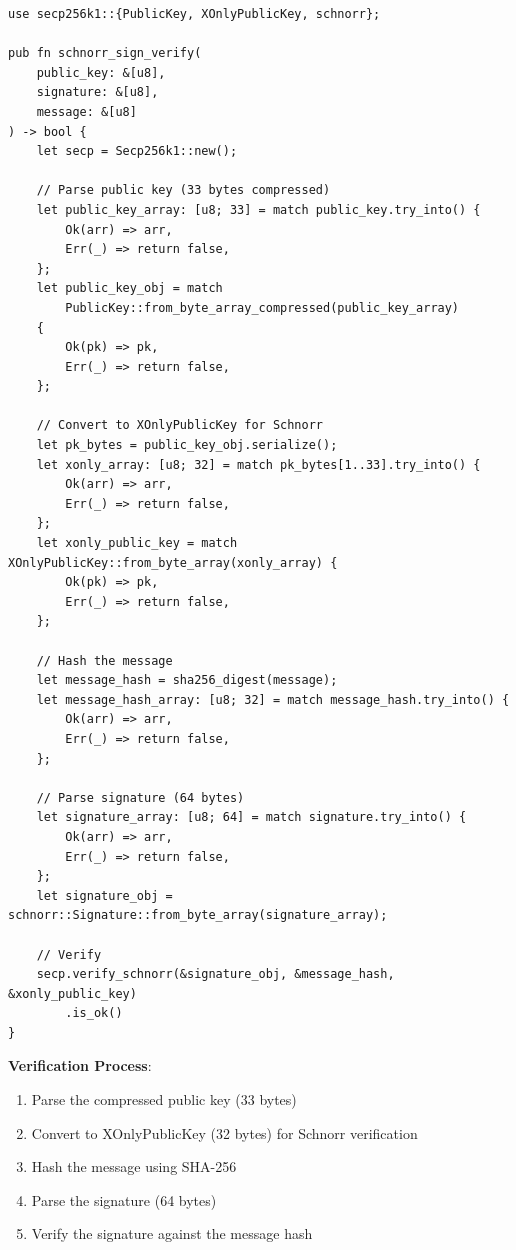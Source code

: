 \begin{listing}[htbp]
\caption{Schnorr signature verification ()}
\label{lst:ch08-schnorr-verify}
\begin{verbatim}
use secp256k1::{PublicKey, XOnlyPublicKey, schnorr};

pub fn schnorr_sign_verify(
    public_key: &[u8],
    signature: &[u8],
    message: &[u8]
) -> bool {
    let secp = Secp256k1::new();

    // Parse public key (33 bytes compressed)
    let public_key_array: [u8; 33] = match public_key.try_into() {
        Ok(arr) => arr,
        Err(_) => return false,
    };
    let public_key_obj = match
        PublicKey::from_byte_array_compressed(public_key_array)
    {
        Ok(pk) => pk,
        Err(_) => return false,
    };

    // Convert to XOnlyPublicKey for Schnorr
    let pk_bytes = public_key_obj.serialize();
    let xonly_array: [u8; 32] = match pk_bytes[1..33].try_into() {
        Ok(arr) => arr,
        Err(_) => return false,
    };
    let xonly_public_key = match XOnlyPublicKey::from_byte_array(xonly_array) {
        Ok(pk) => pk,
        Err(_) => return false,
    };

    // Hash the message
    let message_hash = sha256_digest(message);
    let message_hash_array: [u8; 32] = match message_hash.try_into() {
        Ok(arr) => arr,
        Err(_) => return false,
    };

    // Parse signature (64 bytes)
    let signature_array: [u8; 64] = match signature.try_into() {
        Ok(arr) => arr,
        Err(_) => return false,
    };
    let signature_obj = schnorr::Signature::from_byte_array(signature_array);

    // Verify
    secp.verify_schnorr(&signature_obj, &message_hash, &xonly_public_key)
        .is_ok()
}
\end{verbatim}
\end{listing}

\textbf{Verification Process}:
\begin{enumerate}
  \item Parse the compressed public key (33 bytes)
  \item Convert to XOnlyPublicKey (32 bytes) for Schnorr verification
  \item Hash the message using SHA-256
  \item Parse the signature (64 bytes)
  \item Verify the signature against the message hash
\end{enumerate}

